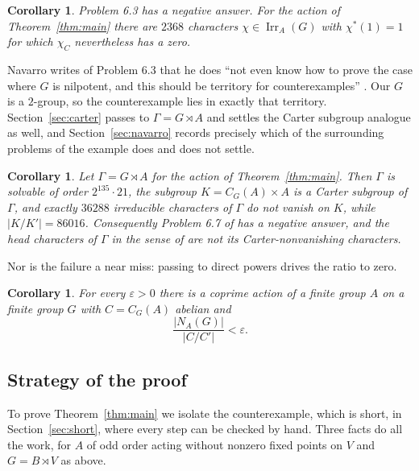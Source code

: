 \documentclass[11pt,a4paper,reqno]{amsart}
\newtheorem{lettercorollary}[lettertheorem]{Corollary}
\theoremstyle{definition}
\theoremstyle{remark}
\newcommand{\Irr}{\operatorname{Irr}}
\begin{document}
\begin{lettercorollary}\label{cor:criterion}
Problem 6.3 has a negative answer.  For the action of
Theorem~\ref{thm:main} there are $2368$ characters $\chi\in\Irr_A(G)$
with $\chi^*(1)=1$ for which $\chi_C$ nevertheless has a zero.
\end{lettercorollary}

Navarro writes of Problem 6.3 that he does ``not even know how to prove
the case where $G$ is nilpotent, and this should be territory for
counterexamples'' \cite[p.~189]{navarro-problems}.  Our $G$ is a
$2$-group, so the counterexample lies in exactly that territory.
Section~\ref{sec:carter} passes to $\Gamma=G\rtimes A$ and settles
the Carter subgroup analogue as well, and Section~\ref{sec:navarro}
records precisely which of the surrounding problems of
\cite{navarro-problems} the example does and does not settle.

\begin{lettercorollary}\label{cor:carter-intro}
Let $\Gamma=G\rtimes A$ for the action of Theorem~\ref{thm:main}.  Then
$\Gamma$ is solvable of order $2^{135}\cdot21$, the subgroup
$K=C_G(A)\times A$ is a Carter subgroup of $\Gamma$, and exactly
$36288$ irreducible characters of $\Gamma$ do not vanish on $K$, while
$|K/K'|=86016$.  Consequently Problem 6.7 of \cite{navarro-problems} has
a negative answer, and the head characters of $\Gamma$ in the sense of
\cite{isaacs-carter} are not its Carter-nonvanishing characters.
\end{lettercorollary}

Nor is the failure a near miss: passing to direct powers drives the
ratio to zero.

\begin{lettercorollary}\label{cor:powers}
For every $\varepsilon>0$ there is a coprime action of a finite group
$A$ on a finite group $G$ with $C=C_G(A)$ abelian and
\[
 \frac{|N_A(G)|}{|C/C'|}<\varepsilon .
\]
\end{lettercorollary}

\subsection*{Strategy of the proof}

To prove Theorem~\ref{thm:main} we isolate the counterexample, which is
short, in Section~\ref{sec:short}, where every step can be checked by
hand.  Three facts do all the work, for $A$ of odd order acting without
nonzero fixed points on $V$ and $G=B\rtimes V$ as above.
\end{document}
